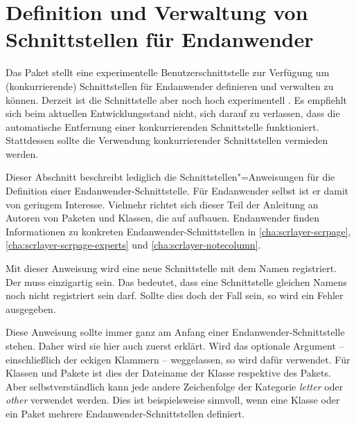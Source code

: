 
\section{Definition und Verwaltung von Schnittstellen für Endanwender}

Das Paket  stellt eine experimentelle Benutzerschnittstelle
zur Verfügung um (konkurrierende) Schnittstellen für Endanwender definieren
und verwalten zu können. %
Derzeit ist die Schnittstelle aber noch hoch
experimentell%
. Es empfiehlt sich beim aktuellen Entwicklungsstand nicht, sich darauf zu
verlassen, dass die automatische Entfernung einer konkurrierenden
Schnittstelle funktioniert. Stattdessen sollte die Verwendung konkurrierender
Schnittstellen vermieden werden.

Dieser Abschnitt beschreibt lediglich die Schnittstellen"=Anweisungen für die
Definition einer Endanwender-Schnittstelle. Für Endanwender selbst ist er
damit von geringem Interesse. Vielmehr richtet sich dieser Teil der Anleitung
an Autoren von Paketen und Klassen, die auf 
aufbauen. Endanwender finden Informationen zu konkreten
Endanwender-Schnittstellen in \autoref{cha:scrlayer-scrpage},
\autoref{cha:scrlayer-scrpage-experts} und \autoref{cha:scrlayer-notecolumn}.


\begin{Declaration}
\end{Declaration}
Mit dieser Anweisung wird eine neue Schnittstelle mit dem Namen
 registriert. Der
 muss einzigartig sein. Das bedeutet, dass eine
Schnittstelle gleichen Namens noch nicht registriert sein darf. Sollte dies
doch der Fall sein, so wird ein Fehler ausgegeben.

Diese Anweisung sollte immer ganz am Anfang einer Endanwender-Schnittstelle
stehen. Daher wird sie hier auch zuerst erklärt. Wird das optionale Argument
-- einschließlich der eckigen Klammern -- weggelassen, so wird dafür
 verwendet. Für Klassen und
Pakete ist dies der Dateiname der Klasse respektive des Pakets. Aber
selbstverständlich kann jede andere Zeichenfolge der Kategorie \emph{letter}
oder \emph{other} verwendet werden. Dies ist beispielsweise sinnvoll, wenn
eine Klasse oder ein Paket mehrere Endanwender-Schnittstellen definiert.%
\EndIndexGroup


